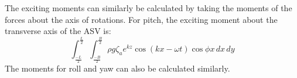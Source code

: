The exciting moments can similarly be calculated by taking the moments of the forces about the axis of rotations. For pitch, the exciting moment about the transverse axis of the ASV is:
\begin{equation}
  \int_{\frac{-L}{2}}^{\frac{L}{2}} 
  \int_{\frac{-B}{2}}^{\frac{B}{2}} 
  \rho g \zeta_a e^{k z} \cos (k x - \omega t) \cos \phi x
  \,dx \,dy 
\end{equation}
The moments for roll and yaw can also be calculated similarly.
